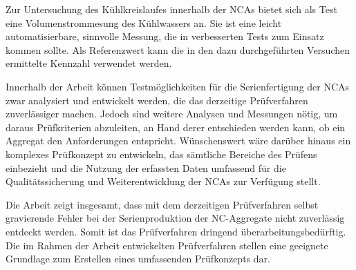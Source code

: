 


Zur Untersuchung des Kühlkreislaufes innerhalb der NCAs bietet sich als Test eine Volumenstrommesung des Kühlwassers an. Sie ist eine leicht automatisierbare, sinnvolle Messung, die in verbesserten Tests zum Einsatz kommen sollte. Als Referenzwert kann die in den dazu durchgeführten Versuchen ermittelte Kennzahl verwendet werden.








Innerhalb der Arbeit können Testmöglichkeiten für die Serienfertigung der NCAs zwar analysiert und entwickelt werden, die das derzeitige Prüfverfahren zuverlässiger machen. Jedoch sind weitere Analysen und Messungen nötig, um daraus Prüfkriterien abzuleiten, an Hand derer entschieden werden kann, ob ein Aggregat den Anforderungen entspricht. Wünschenswert wäre darüber hinaus ein komplexes Prüfkonzept zu entwickeln, das sämtliche Bereiche des Prüfens einbezieht und die Nutzung der erfassten Daten umfassend für die Qualitätssicherung und Weiterentwicklung der NCAs zur Verfügung stellt. 


Die Arbeit zeigt insgesamt, dass mit dem derzeitigen Prüfverfahren selbst gravierende Fehler bei der Serienproduktion der NC-Aggregate nicht zuverlässig entdeckt werden. Somit ist das Prüfverfahren dringend überarbeitungsbedürftig. Die im Rahmen der Arbeit entwickelten Prüfverfahren stellen eine geeignete Grundlage zum Erstellen eines umfassenden Prüfkonzepts dar.

























